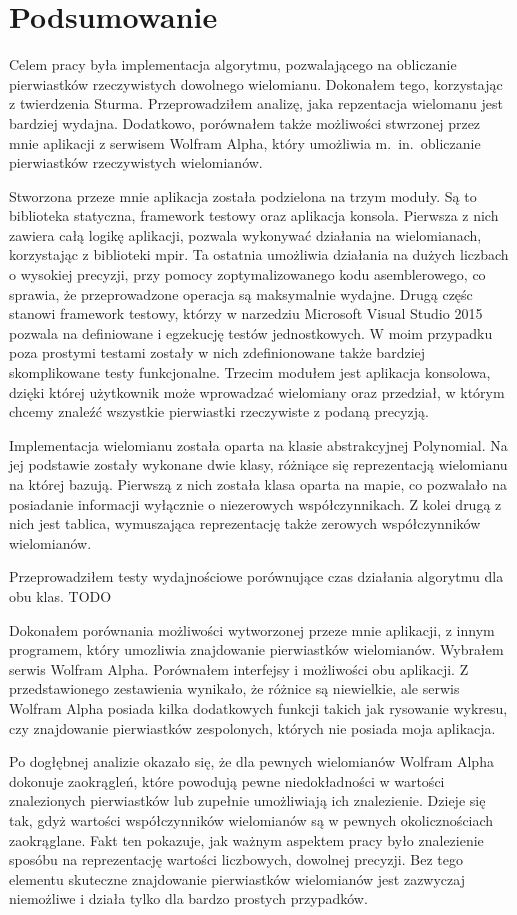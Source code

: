 \chapter{Podsumowanie}

Celem pracy była implementacja algorytmu, pozwalającego na obliczanie pierwiastków rzeczywistych dowolnego wielomianu. Dokonałem tego, korzystając z twierdzenia Sturma. Przeprowadziłem analizę, jaka repzentacja wielomanu jest bardziej wydajna. Dodatkowo, porównałem także możliwości stwrzonej przez mnie aplikacji z serwisem Wolfram Alpha, który umożliwia m.\ in.\ obliczanie pierwiastków rzeczywistych wielomianów.

Stworzona przeze mnie aplikacja została podzielona na trzym moduły. Są to biblioteka statyczna, framework testowy oraz aplikacja konsola. Pierwsza z nich zawiera całą logikę aplikacji, pozwala wykonywać działania na wielomianach, korzystając z biblioteki mpir. Ta ostatnia umożliwia działania na dużych liczbach o wysokiej precyzji, przy pomocy zoptymalizowanego kodu asemblerowego, co sprawia, że przeprowadzone operacja są maksymalnie wydajne. Drugą częśc stanowi framework testowy, którzy w narzedziu Microsoft Visual Studio 2015 pozwala na definiowane i egzekucję testów jednostkowych. W moim przypadku poza prostymi testami zostały w nich zdefinionowane także bardziej skomplikowane testy funkcjonalne. Trzecim modułem jest aplikacja konsolowa, dzięki której użytkownik może wprowadzać wielomiany oraz przedział, w którym chcemy znaleźć wszystkie pierwiastki rzeczywiste z podaną precyzją.

Implementacja wielomianu została oparta na klasie abstrakcyjnej Polynomial. Na jej podstawie zostały wykonane dwie klasy, różniące się reprezentacją wielomianu na której bazują. Pierwszą z nich została klasa oparta na mapie, co pozwalało na posiadanie informacji wyłącznie o niezerowych współczynnikach. Z kolei drugą z nich jest tablica, wymuszająca reprezentację także zerowych współczynników wielomianów.

Przeprowadziłem testy wydajnościowe porównujące czas działania algorytmu dla obu klas. TODO

Dokonałem porównania możliwości wytworzonej przeze mnie aplikacji, z innym programem, który umozliwia znajdowanie pierwiastków wielomianów. Wybrałem serwis Wolfram Alpha. Porównałem interfejsy i możliwości obu aplikacji. Z przedstawionego zestawienia wynikało, że różnice są niewielkie, ale serwis Wolfram Alpha posiada kilka dodatkowych funkcji takich jak rysowanie wykresu, czy znajdowanie pierwiastków zespolonych, których nie posiada moja aplikacja.

Po dogłębnej analizie okazało się, że dla pewnych wielomianów Wolfram Alpha dokonuje zaokrągleń, które powodują pewne niedokładności w wartości znalezionych pierwiastków lub zupełnie umożliwiają ich znalezienie. Dzieje się tak, gdyż wartości współczynników wielomianów są w pewnych okolicznościach zaokrąglane. Fakt ten pokazuje, jak ważnym aspektem pracy było znalezienie sposóbu na reprezentację wartości liczbowych, dowolnej precyzji. Bez tego elementu skuteczne znajdowanie pierwiastków wielomianów jest zazwyczaj niemożliwe i działa tylko dla bardzo prostych przypadków.
